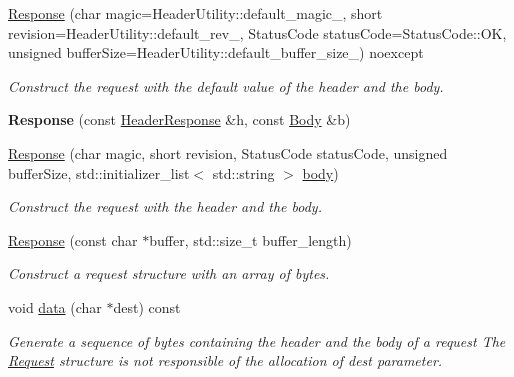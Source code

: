 \begin{DoxyCompactItemize}
\item 
\mbox{\label{structprotocol_1_1serialize_1_1_response_adafc846df88780a7c0ca07dfcd17458e}} 
\hyperlink{structprotocol_1_1serialize_1_1_response_adafc846df88780a7c0ca07dfcd17458e}{Response} (char magic=Header\+Utility\+::default\+\_\+magic\+\_\+, short revision=Header\+Utility\+::default\+\_\+rev\+\_\+, Status\+Code status\+Code=Status\+Code\+::\+OK, unsigned buffer\+Size=Header\+Utility\+::default\+\_\+buffer\+\_\+size\+\_\+) noexcept
\begin{DoxyCompactList}\small\item\em Construct the request with the default value of the header and the body. \end{DoxyCompactList}\item 
\mbox{\label{structprotocol_1_1serialize_1_1_response_a882ead0023ca6605796742ed04c970cf}} 
{\bfseries Response} (const \hyperlink{structprotocol_1_1serialize_1_1_header_response}{Header\+Response} \&h, const \hyperlink{classprotocol_1_1serialize_1_1_body}{Body} \&b)
\item 
\hyperlink{structprotocol_1_1serialize_1_1_response_a3775c0f74e9dafd7a554fa9602b58e76}{Response} (char magic, short revision, Status\+Code status\+Code, unsigned buffer\+Size, std\+::initializer\+\_\+list$<$ std\+::string $>$ \hyperlink{structprotocol_1_1serialize_1_1_response_a6706ef7e0a22f2ba78e1b6ff12955568}{body})
\begin{DoxyCompactList}\small\item\em Construct the request with the header and the body. \end{DoxyCompactList}\item 
\hyperlink{structprotocol_1_1serialize_1_1_response_a73ba4942762283fdbd200fc5fa6a8e00}{Response} (const char $\ast$buffer, std\+::size\+\_\+t buffer\+\_\+length)
\begin{DoxyCompactList}\small\item\em Construct a request structure with an array of bytes. \end{DoxyCompactList}\item 
void \hyperlink{structprotocol_1_1serialize_1_1_response_a7f7cf53d43bb06cc07b3230c1f530c8c}{data} (char $\ast$dest) const
\begin{DoxyCompactList}\small\item\em Generate a sequence of bytes containing the header and the body of a request The \hyperlink{structprotocol_1_1serialize_1_1_request}{Request} structure is not responsible of the allocation of dest parameter. \end{DoxyCompactList}\item 

\end{DoxyCompactItemize}
